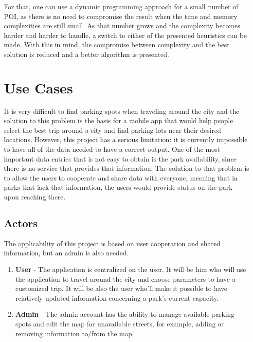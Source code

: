 \documentclass[a4paper, 12pt]{report}
\begin{document}
    For that, one can use a dynamic programming approach for a small number of POI, as there is no need to compromise the result when the time and memory complexities are still small. As that number grows and the complexity becomes harder and harder to handle, a switch to either of the presented heuristics can be made. With this in mind, the compromise between complexity and the best solution is reduced and a better algorithm is presented.
    
    \chapter{Use Cases} \label{application}
     
    It is very difficult to find parking spots when traveling around the city and the solution to this problem is the basis for a mobile app that would help people select the best trip around a city and find parking lots near their desired locations. However, this project has a serious limitation: it is currently impossible to have all of the data needed to have a correct output. One of the most important data entries that is not easy to obtain is the park availability, since there is no service that provides that information. The solution to that problem is to allow the users to cooperate and share data with everyone, meaning that in parks that lack that information, the users would provide status on the park upon reaching there.
    
    \section{Actors}
    
    The applicability of this project is based on user cooperation and shared information, but an admin is also needed.
        
    \begin{enumerate}
        \item \textbf{User} - The application is centralized on the user. It will be him who will use the application to travel around the city and choose parameters to have a customized trip. It will be also the user who'll make it possible to have relatively updated information concerning a park's current capacity.
        \item \textbf{Admin} - The admin account has the ability to manage available parking spots and edit the map for unavailable streets, for example, adding or removing information to/from the map. 
    \end{enumerate}
    
\end{document}
